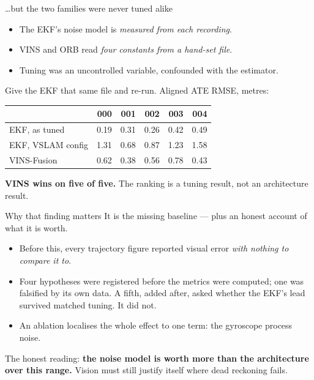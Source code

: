 \documentclass[aspectratio=169,11pt]{beamer}
\newcommand{\bad}[1]{\textcolor{flagred}{#1}}
\begin{document}
\begin{frame}{\ldots{}but the two families were never tuned alike}
  \begin{itemize}
    \item The EKF's noise model is \emph{measured from each recording}.
    \item VINS and ORB read \emph{four constants from a hand-set file}.
    \item Tuning was an uncontrolled variable, confounded with the estimator.
  \end{itemize}

  \vspace{0.4em}
  Give the EKF that same file and re-run. Aligned ATE RMSE, metres:

  \vspace{0.3em}
  \centering\small
  \begin{tabular}{lrrrrr}
    \toprule
     & 000 & 001 & 002 & 003 & 004 \\
    \midrule
    EKF, as tuned & 0.19 & 0.31 & 0.26 & 0.42 & 0.49 \\
    EKF, VSLAM config & \bad{1.31} & \bad{0.68} & \bad{0.87} & \bad{1.23} & \bad{1.58} \\
    VINS-Fusion & 0.62 & 0.38 & 0.56 & 0.78 & 0.43 \\
    \bottomrule
  \end{tabular}

  \vspace{0.5em}
  \begin{alertblock}{}
    \textbf{VINS wins on five of five.} The ranking is a tuning result, not an
    architecture result.
  \end{alertblock}
\end{frame}

\begin{frame}{Why that finding matters}
  It is the missing baseline --- plus an honest account of what it is worth.

  \vspace{0.8em}
  \begin{itemize}
    \item Before this, every trajectory figure reported visual error
      \emph{with nothing to compare it to}.
    \item Four hypotheses were registered before the metrics were computed; one
      was falsified by its own data. A fifth, added after, asked whether the
      EKF's lead survived matched tuning. It did not.
    \item An ablation localises the whole effect to one term: the gyroscope
      process noise.
  \end{itemize}

  \vspace{0.8em}
  The honest reading: \textbf{the noise model is worth more than the
  architecture over this range.} Vision must still justify itself where dead
  reckoning fails.
\end{frame}
\end{document}
